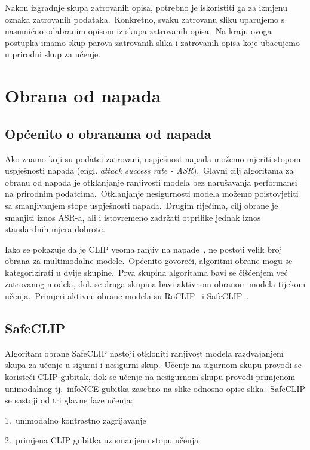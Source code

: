 \documentclass[times, utf8, seminar, numeric]{fer}
\begin{document}
Nakon izgradnje skupa zatrovanih opisa, potrebno je iskoristiti ga za izmjenu oznaka zatrovanih podataka.\ 
Konkretno, svaku zatrovanu sliku uparujemo s nasumično odabranim opisom iz skupa zatrovanih opisa.\ 
Na kraju ovoga postupka imamo skup parova zatrovanih slika i zatrovanih opisa koje ubacujemo u prirodni skup za učenje.\

\chapter{Obrana od napada}

\section{Općenito o obranama od napada}

Ako znamo koji su podatci zatrovani, uspješnost napada možemo mjeriti stopom uspješnosti napada (engl. \textit{attack success rate - ASR}).\ 
Glavni cilj algoritama za obranu od napada je otklanjanje ranjivosti modela bez narušavanja performansi na prirodnim podatcima.\ 
Otklanjanje nesigurnosti modela možemo poistovjetiti sa smanjivanjem stope uspješnosti napada.\ Drugim riječima, cilj obrane je smanjiti iznos ASR-a, ali i istovremeno zadržati otprilike jednak iznos standardnih mjera dobrote.\ 
  
Iako se pokazuje da je CLIP veoma ranjiv na napade~\cite{carlini2021poisoning}, ne postoji velik broj obrana za multimodalne modele.\ 
Općenito govoreći, algoritmi obrane mogu se kategorizirati u dvije skupine.\ 
Prva skupina algoritama bavi se čišćenjem već zatrovanog modela, dok se druga skupina bavi aktivnom obranom modela tijekom učenja.\ 
Primjeri aktivne obrane modela su RoCLIP~\cite{yang2023robust} i SafeCLIP~\cite{yang2023better}.\

\section{SafeCLIP}

Algoritam obrane SafeCLIP nastoji otkloniti ranjivost modela razdvajanjem skupa za učenje u sigurni i nesigurni skup.\ 
Učenje na sigurnom skupu provodi se koristeći CLIP gubitak, dok se učenje na nesigurnom skupu provodi primjenom unimodalnog tj.\ infoNCE gubitka zasebno na slike odnosno opise slika.\ 
SafeCLIP se sastoji od tri glavne faze učenja: 

1.\ unimodalno kontrastno zagrijavanje
  
2.\ primjena CLIP gubitka uz smanjenu stopu učenja   
  
\end{document}
